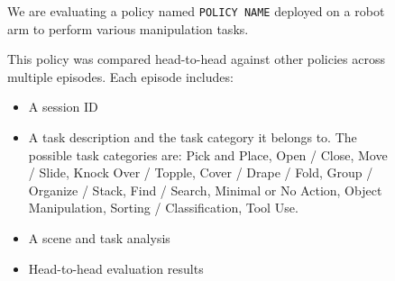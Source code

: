 \begin{figure}[ht!]
\colorbox{gray!10}{
\begin{minipage}{\linewidth}
\fontsize{8pt}{8pt}\selectfont
We are evaluating a policy named \texttt{POLICY NAME} deployed on a robot arm to perform various manipulation tasks.\par
This policy was compared head-to-head against other policies across multiple episodes. Each episode includes:\par
\begin{itemize}
    \item A session ID
    \item A task description and the task category it belongs to. The possible task categories are: Pick and Place, Open / Close, Move / Slide, Knock Over / Topple, Cover / Drape / Fold, Group / Organize / Stack, Find / Search, Minimal or No Action, Object Manipulation, Sorting / Classification, Tool Use.
    \item A scene and task analysis
    \item Head-to-head evaluation results
\end{itemize}


\end{minipage}}
\end{figure}
